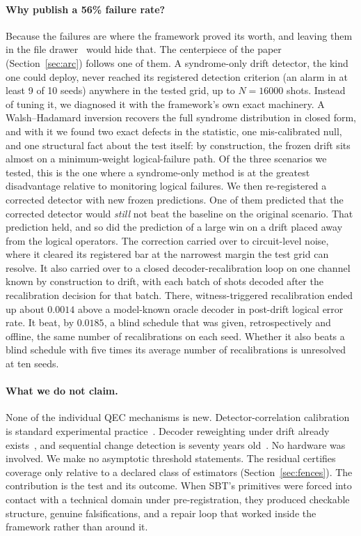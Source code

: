 \paragraph{Why publish a 56\% failure rate?} %
Because the failures are where the framework proved its worth, and leaving them in the file drawer~\cite{rosenthal1979filedrawer} would hide that. The centerpiece of the paper (Section~\ref{sec:arc}) follows one of them. A syndrome-only drift detector, the kind one could deploy, never reached its registered detection criterion (an alarm in at least 9 of 10 seeds) anywhere in the tested grid, up to $N = 16000$ shots. Instead of tuning it, we diagnosed it with the framework's own exact machinery. A Walsh--Hadamard inversion recovers the full syndrome distribution in closed form, and with it we found two exact defects in the statistic, one mis-calibrated null, and one structural fact about the test itself: by construction, the frozen drift sits almost on a minimum-weight logical-failure path. Of the three scenarios we tested, this is the one where a syndrome-only method is at the greatest disadvantage relative to monitoring logical failures. We then re-registered a corrected detector with new frozen predictions. One of them predicted that the corrected detector would \emph{still} not beat the baseline on the original scenario. That prediction held, and so did the prediction of a large win on a drift placed away from the logical operators. %
The correction carried over to circuit-level noise, where it cleared its registered bar at the narrowest margin the test grid can resolve. It also carried over to a closed decoder-recalibration loop on one channel known by construction to drift, with each batch of shots decoded after the recalibration decision for that batch. There, witness-triggered recalibration ended up about $0.0014$ above a model-known oracle decoder in post-drift logical error rate. It beat, by $0.0185$, a blind schedule that was given, retrospectively and offline, the same number of recalibrations on each seed. Whether it also beats a blind schedule with five times its average number of recalibrations is unresolved at ten seeds. %

\paragraph{What we do not claim.} None of the individual QEC mechanisms is new. Detector-correlation calibration is standard experimental practice~\cite{fowler2014scalable,chen2021exponential,google2023suppressing}. Decoder reweighting under drift already exists~\cite{spitz2018adaptive,huo2017realtime,dgr2023reweighting,bhardwaj2025drifting}, and sequential change detection is seventy years old~\cite{page1954continuous}. No hardware was involved. We make no asymptotic threshold statements. The residual certifies coverage only relative to a declared class of estimators (Section~\ref{sec:fences}). The contribution is the test and its outcome. When SBT's primitives were forced into contact with a technical domain under pre-registration, they produced checkable structure, genuine falsifications, and a repair loop that worked inside the framework rather than around it.

